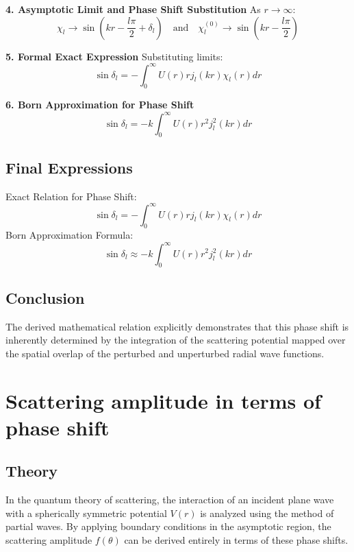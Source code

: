 \documentclass[12pt]{report}
\begin{document}
\textbf{4. Asymptotic Limit and Phase Shift Substitution}
As $r \rightarrow \infty$:
\begin{equation*}
\chi_l \rightarrow \sin\left(kr - \frac{l\pi}{2} + \delta_l\right) \quad \text{and} \quad \chi_l^{(0)} \rightarrow \sin\left(kr - \frac{l\pi}{2}\right)
\end{equation*}

\textbf{5. Formal Exact Expression} Substituting limits:
\begin{equation}
\sin \delta_l = -\int_0^\infty U(r) r j_l(kr) \chi_l(r) dr
\end{equation}

\textbf{6. Born Approximation for Phase Shift}
\begin{equation}
\sin \delta_l = -k \int_0^\infty U(r) r^2 j_l^2(kr) dr
\end{equation}

\subsection*{Final Expressions}
Exact Relation for Phase Shift:
\begin{equation}
\boxed{ \sin \delta_l = -\int_0^\infty U(r) r j_l(kr) \chi_l(r) dr }
\end{equation}
Born Approximation Formula:
\begin{equation}
\boxed{ \sin \delta_l \approx -k \int_0^\infty U(r) r^2 j_l^2(kr) dr }
\end{equation}

\subsection*{Conclusion}
The derived mathematical relation explicitly demonstrates that this phase shift is inherently determined by the integration of the scattering potential mapped over the spatial overlap of the perturbed and unperturbed radial wave functions.

\section{Scattering amplitude in terms of phase shift}



\subsection*{Theory}
In the quantum theory of scattering, the interaction of an incident plane wave with a spherically symmetric potential $V(r)$ is analyzed using the method of partial waves. By applying boundary conditions in the asymptotic region, the scattering amplitude $f(\theta)$ can be derived entirely in terms of these phase shifts.
\end{document}
